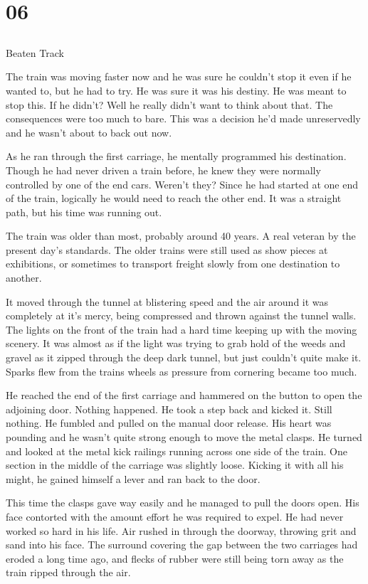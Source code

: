 \chapter{06}
\section{}
Beaten Track  

The train was moving faster now and he was sure he couldn't stop it even if he wanted to, but he had to try.  He was sure it was his destiny.  He was meant to stop this.  If he didn't?  Well he really didn't want to think about that.  The consequences were too much to bare.  This was a decision he'd made unreservedly and he wasn't about to back out now.

As he ran through the first carriage, he mentally programmed his destination.  Though he had never driven a train before, he knew they were normally controlled by one of the end cars.  Weren't they?  Since he had started at one end of the train, logically he would need to reach the other end.  It was a straight path, but his time was running out.

The train was older than most, probably around 40 years.  A real veteran by the present day's standards.  The older trains were still used as show pieces at exhibitions, or sometimes to transport freight slowly from one destination to another.  

It moved through the tunnel at blistering speed and the air around it was completely at it's mercy, being compressed and thrown against the tunnel walls.  The lights on the front of the train had a hard time keeping up with the moving scenery.  It was almost as if the light was trying to grab hold of the weeds and gravel as it zipped through the deep dark tunnel, but just couldn't quite make it.  Sparks flew from the trains wheels as pressure from cornering became too much.  

He reached the end of the first carriage and hammered on the button to open the adjoining door.  Nothing happened.  He took a step back and kicked it.  Still nothing.  He fumbled and pulled on the manual door release.  His heart was pounding and he wasn't quite strong enough to move the metal clasps.  He turned and looked at the metal kick railings running across one side of the train.  One section in the middle of the carriage was slightly loose.  Kicking it with all his might, he gained himself a lever and ran back to the door.

This time the clasps gave way easily and he managed to pull the doors open.  His face contorted with the amount effort he was required to expel.  He had never worked so hard in his life.  Air rushed in through the doorway, throwing grit and sand into his face.  The surround covering the gap between the two carriages had eroded a long time ago, and flecks of rubber were still being torn away as the train ripped through the air.

